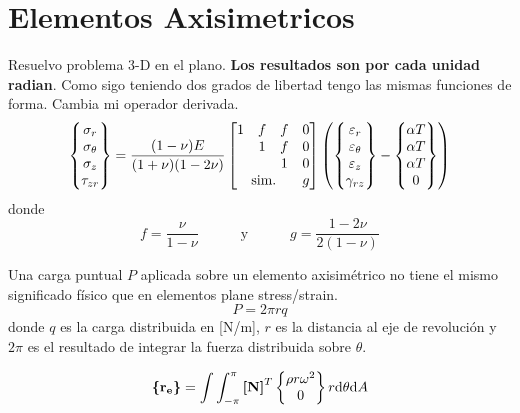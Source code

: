 \section{Elementos Axisimetricos}
Resuelvo problema 3-D en el plano. \textbf{Los resultados son por cada unidad radian}. Como sigo teniendo dos grados de libertad tengo las mismas funciones de forma. Cambia mi operador derivada.
\[
\begin{Bmatrix}
\sigma_\radial \\
\sigma_\theta \\
\sigma_z \\
\tau_{z\radial}
\end{Bmatrix}
= \frac{(1-\nu)E}{(1+\nu)(1-2\nu)}
\begin{bmatrix}
1 & \eff & \eff & 0 \\
& 1 & \eff & 0 \\
& & 1 & 0 \\
\textrm{sim.}\unspace& & & g 
\end{bmatrix}
\left(
\begin{Bmatrix}
\varepsilon_\radial \\
\varepsilon_\theta \\
\varepsilon_z \\
\gamma_{\radial z}
\end{Bmatrix}
-
\begin{Bmatrix}
\alpha T\\
\alpha T \\
\alpha T \\
0
\end{Bmatrix}
\right)
\]
donde 
\[
f=\frac{\nu}{1-\nu}\qquad \quad \textrm{y}\quad \qquad g=\frac{1-2\nu}{2(1-\nu)}
\]

Una carga puntual $P$ aplicada sobre un elemento axisimétrico no tiene el mismo significado físico que en elementos plane stress/strain. 
\[
P=2\pi rq
\]
donde $q$ es la carga distribuida en [N/m], $r$ es la distancia al eje de revolución y $2 \pi$ es el resultado de integrar la fuerza distribuida sobre $\theta$. 

\[
\boldsymbol{\{ }\mathbf{r_e} \boldsymbol{\}} = \int\int_{-\pi}^{\pi} \boldsymbol{[}\mathbf{N} \boldsymbol{]}^T \begin{Bmatrix}
\rho r \omega ^2 \\
0
\end{Bmatrix} r \textrm{d} \theta \textrm{d} A
\]